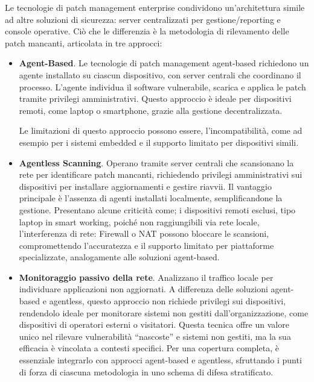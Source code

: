                 Le tecnologie di patch management enterprise condividono un'architettura simile ad altre soluzioni di sicurezza: server centralizzati per gestione/reporting e console operative. Ciò che le differenzia è la metodologia di rilevamento delle patch mancanti, articolata in tre approcci: 
                \begin{itemize}
                    \item \textbf{Agent-Based}. Le tecnologie di patch management agent-based richiedono un agente installato su ciascun dispositivo, con server centrali che coordinano il processo. L'agente individua il software vulnerabile, scarica e applica le patch tramite privilegi amministrativi. Questo approccio è ideale per dispositivi remoti, come laptop o smartphone, grazie alla gestione decentralizzata.
                    
                    Le limitazioni di questo approccio possono essere, l'incompatibilità, come ad esempio per i sistemi embedded e il supporto limitato per dispositivi simili.
                    \item \textbf{Agentless Scanning}. Operano tramite server centrali che scansionano la rete per identificare patch mancanti, richiedendo privilegi amministrativi sui dispositivi per installare aggiornamenti e gestire riavvii. Il vantaggio principale è l'assenza di agenti installati localmente, semplificandone la gestione. Presentano alcune criticità come; i dispositivi remoti esclusi, tipo laptop in smart working, poiché non raggiungibili via rete locale, l'interferenza di rete: Firewall o NAT possono bloccare le scansioni, compromettendo l’accuratezza e il supporto limitato per piattaforme specializzate, analogamente alle soluzioni agent-based.
                    \item \textbf{Monitoraggio passivo della rete}. Analizzano il traffico locale per individuare applicazioni non aggiornati. A differenza delle soluzioni agent-based e agentless, questo approccio non richiede privilegi sui dispositivi, rendendolo ideale per monitorare sistemi non gestiti dall'organizzazione, come dispositivi di operatori esterni o visitatori. Questa tecnica offre un valore unico nel rilevare vulnerabilità “nascoste” e sistemi non gestiti, ma la sua efficacia è vincolata a contesti specifici. Per una copertura completa, è essenziale integrarlo con approcci agent-based e agentless, sfruttando i punti di forza di ciascuna metodologia in uno schema di difesa stratificato.
                \end{itemize}

